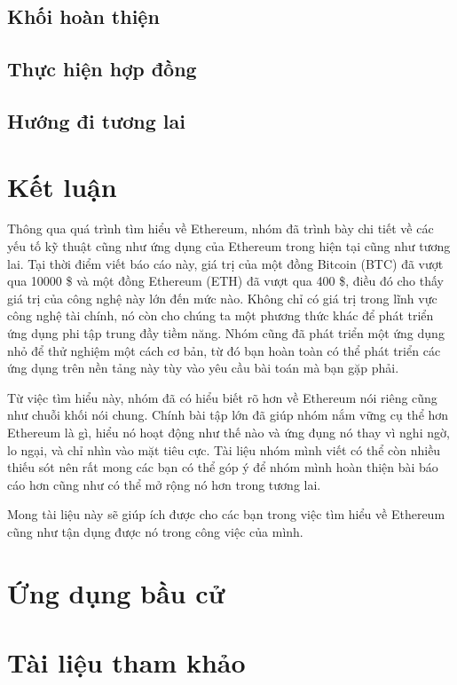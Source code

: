 \documentclass[12pt]{article}
\begin{document}
		\subsection{Khối hoàn thiện}
		
		
		\subsection{Thực hiện hợp đồng}
		
		
		\subsection{Hướng đi tương lai}
			

	\section{Kết luận}
	Thông qua quá trình tìm hiểu về Ethereum, nhóm đã trình bày chi tiết về các yếu tố kỹ thuật cũng như ứng dụng của Ethereum trong hiện tại cũng như tương lai. Tại thời điểm viết báo cáo này, giá trị của một đồng Bitcoin (BTC) đã vượt qua 10000 \$ và một đồng Ethereum (ETH) đã vượt qua 400 \$, điều đó cho thấy giá trị của công nghệ này lớn đến mức nào. Không chỉ có giá trị trong lĩnh vực công nghệ tài chính, nó còn cho chúng ta một phương thức khác để phát triển ứng dụng phi tập trung đầy tiềm năng. Nhóm cũng đã phát triển một ứng dụng nhỏ để thử nghiệm một cách cơ bản, từ đó bạn hoàn toàn có thể phát triển các ứng dụng trên nền tảng này tùy vào yêu cầu bài toán mà bạn gặp phải.
	
	Từ việc tìm hiểu này, nhóm đã có hiểu biết rõ hơn về Ethereum nói riêng cũng như chuỗi khối nói chung. Chính bài tập lớn đã giúp nhóm nắm vững cụ thể hơn Ethereum là gì, hiểu nó hoạt động như thế nào và ứng đụng nó thay vì nghi ngờ, lo ngại, và chỉ nhìn vào mặt tiêu cực. Tài liệu nhóm mình viết có thể còn nhiều thiếu sót nên rất mong các bạn có thể góp ý để nhóm mình hoàn thiện bài báo cáo hơn cũng như có thể mở rộng nó hơn trong tương lai.
	
	Mong tài liệu này sẽ giúp ích được cho các bạn trong việc tìm hiểu về Ethereum cũng như tận dụng được nó trong công việc của mình.
	
	\newpage
	\section{Ứng dụng bầu cử}
	

	\newpage
	\section{Tài liệu tham khảo}
	
\end{document}
